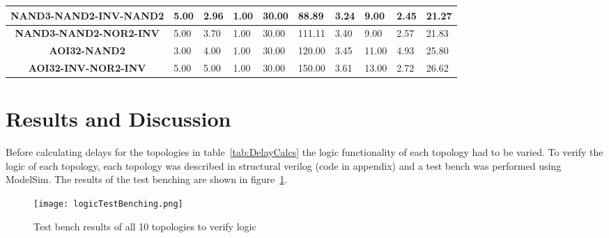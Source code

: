 \documentclass[conference]{IEEEtran}
\begin{document}
\begin{table*}[t]
\begin{tabular}{|c|l|l|l|l|l|l|l|l|l|}
\textbf{NAND3-NAND2-INV-NAND2}   & 5.00                            & 2.96                            & 1.00                            & 30.00                           & 88.89                           & 3.24                               & 9.00                            & 2.45                               & 21.27                           \\ \hline
\textbf{NAND3-NAND2-NOR2-INV}    & 5.00                            & 3.70                            & 1.00                            & 30.00                           & 111.11                          & 3.40                               & 9.00                            & 2.57                               & 21.83                           \\ \hline
\textbf{AOI32-NAND2}             & 3.00                            & 4.00                            & 1.00                            & 30.00                           & 120.00                          & 3.45                               & 11.00                           & 4.93                               & 25.80                           \\ \hline
\textbf{AOI32-INV-NOR2-INV}      & 5.00                            & 5.00                            & 1.00                            & 30.00                           & 150.00                          & 3.61                               & 13.00                           & 2.72                               & 26.62                           \\ \hline
\end{tabular}
\label{tab:DelayCalcs}
\caption{Path and delay calculations}
\end{table*}

\section{Results and Discussion}
\label{sec:Results}

Before calculating delays for the topologies in table~\ref{tab:DelayCalcs} the logic functionality of each topology had to be varied. To verify the logic of each topology, each topology was described in structural verilog (code in appendix) and a test bench was performed using ModelSim. The results of the test benching are shown in figure~\ref{fig:TestBench}.

 \begin{figure}[H]
 \center
    \texttt{[image: logicTestBenching.png]}
    \caption{Test bench results of all 10 topologies to verify logic}
    \label{fig:TestBench}
  \end{figure}
\end{document}
